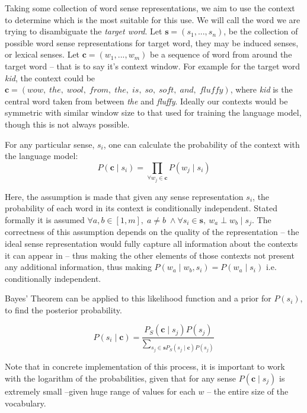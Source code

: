 \documentclass{sig-alternate}
\renewcommand{\c}{\mathbf{c}}
\newcommand{\s}{\mathbf{s}}
\begin{document}
Taking some collection of word sense representations, we aim to use the context to determine which is the most suitable for this use.
We will call the word we are trying to disambiguate the \emph{target word}.
Let $\s=(s_{1},...,s_{n})$, be the collection of possible word sense representations for target word, they may be induced senses, or lexical senses.
Let $\c=(w_{1},...,w_{m})$ be a sequence of word from around the target word -- that is to say it's context window.
For example for the target word \emph{kid}, the context could be {$\c=(wow,\; the,\; wool,\; from,\; the,\; is,\; so,\; soft,\; and,\; fluffy)$}, where \emph{kid} is the central word taken from between \emph{the} and \emph{fluffy}.
Ideally our contexts would be symmetric with similar window size to that used for training the language model, though this is not always possible.
 
For any particular sense, $s_i$, one can calculate the probability of the context with the language model:
\begin{equation} \label{eq:contextprobtrue}
 P(\c \mid s_{i})=\prod_{\forall w_{j}\in\c}P(w_{j} \mid s_{i})
\end{equation}

Here, the assumption is made that given any sense representation $s_i$, the probability of each word in its context is conditionally independent. Stated formally it is assumed $\forall a,b \in [1,m],\; a \ne b\; \wedge \forall s_i \in \s,\:w_a \perp w_b \mid s_j$.
The correctness of this assumption depends on the quality of the representation -- the ideal sense representation would fully capture all information about the contexts it can appear in -- thus making the other elements of those contexts not present any additional information, thus making $P(w_a \mid w_b,s_i)=P(w_a \mid s_i)$ i.e. conditionally independent.


Bayes' Theorem can be applied to this likelihood function and a prior for $P(s_i)$, to find the posterior probability.

\begin{equation} \label{eq:generalwsd}
P(s_{i} \mid \c) = \dfrac{P_S(\c \mid s_{j})P(s_{j})}{\sum_{s_{j}\in\s P_S(s_{j} \mid \c)P(s_{j})}}
\end{equation}

Note that in concrete implementation of this process, it is important to work with the logarithm of the probabilities, given that for any sense $P(\c \mid s_j)$ is extremely small --given huge range of values for each $w$ -- the entire size of the vocabulary.
\end{document}
